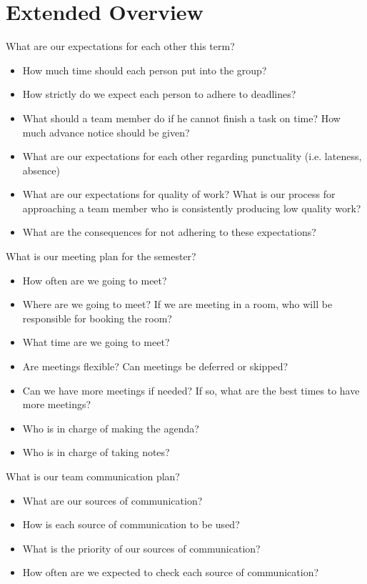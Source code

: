 \documentclass[11pt]{meetingmins}
\begin{document}
\section{Extended Overview}
\begin{hiddenitems}
\item
What are our expectations for each other this term?
\begin{itemize}
	\item{How much time should each person put into the group?}
	\item{How strictly do we expect each person to adhere to deadlines?}
	\item{What should a team member do if he cannot finish a task on time? How much advance
	      notice should be given?}
	\item{What are our expectations for each other regarding punctuality (i.e. lateness, absence)}
	\item{What are our expectations for quality of work? What is our process for approaching a
	      team member who is consistently producing low quality work?}
	\item{What are the consequences for not adhering to these expectations?}
\end{itemize}

\item
What is our meeting plan for the semester?
\begin{itemize}
	\item{How often are we going to meet?}
	\item{Where are we going to meet? If we are meeting in a room, who will be responsible for
	      booking the room?}
	\item{What time are we going to meet?}
	\item{Are meetings flexible? Can meetings be deferred or skipped?}
	\item{Can we have more meetings if needed? If so, what are the best times to have more
	      meetings?}
	\item{Who is in charge of making the agenda?}
	\item{Who is in charge of taking notes?}
	
\end{itemize}

\item
What is our team communication plan?
\begin{itemize}
	\item{What are our sources of communication?}
	\item{How is each source of communication to be used?}
	\item{What is the priority of our sources of communication?}
	\item{How often are we expected to check each source of communication?}
\end{itemize}


\end{hiddenitems}
\end{document}
